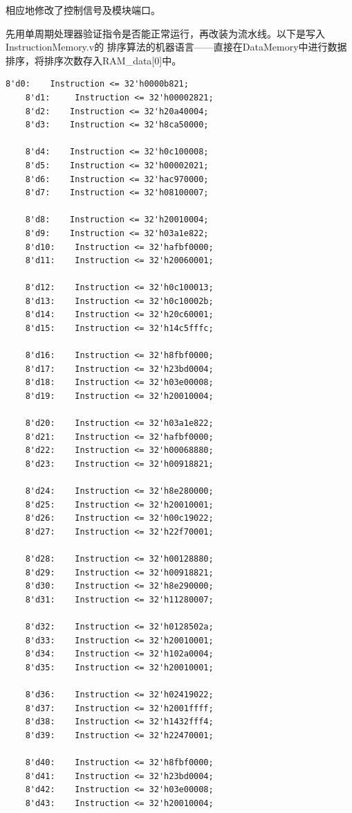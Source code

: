 \documentclass[10pt]{article}
\begin{document}
相应地修改了控制信号及模块端口。

先用单周期处理器验证指令是否能正常运行，再改装为流水线。以下是写入InstructionMemory.v的
排序算法的机器语言——直接在DataMemory中进行数据排序，将排序次数存入RAM\_data[0]中。
\begin{lstlisting}[style={verilog-style}]
    8'd0:    Instruction <= 32'h0000b821;
    8'd1:     Instruction <= 32'h00002821;
    8'd2:    Instruction <= 32'h20a40004;
    8'd3:    Instruction <= 32'h8ca50000;
    
    8'd4:    Instruction <= 32'h0c100008;
    8'd5:    Instruction <= 32'h00002021;
    8'd6:    Instruction <= 32'hac970000;
    8'd7:    Instruction <= 32'h08100007;
    
    8'd8:    Instruction <= 32'h20010004;
    8'd9:    Instruction <= 32'h03a1e822;
    8'd10:    Instruction <= 32'hafbf0000;
    8'd11:    Instruction <= 32'h20060001;
    
    8'd12:    Instruction <= 32'h0c100013;
    8'd13:    Instruction <= 32'h0c10002b;
    8'd14:    Instruction <= 32'h20c60001;
    8'd15:    Instruction <= 32'h14c5fffc;
    
    8'd16:    Instruction <= 32'h8fbf0000;
    8'd17:    Instruction <= 32'h23bd0004;
    8'd18:    Instruction <= 32'h03e00008;
    8'd19:    Instruction <= 32'h20010004;
    
    8'd20:    Instruction <= 32'h03a1e822;
    8'd21:    Instruction <= 32'hafbf0000;
    8'd22:    Instruction <= 32'h00068880;
    8'd23:    Instruction <= 32'h00918821;
    
    8'd24:    Instruction <= 32'h8e280000;
    8'd25:    Instruction <= 32'h20010001;
    8'd26:    Instruction <= 32'h00c19022;
    8'd27:    Instruction <= 32'h22f70001;
    
    8'd28:    Instruction <= 32'h00128880;
    8'd29:    Instruction <= 32'h00918821;
    8'd30:    Instruction <= 32'h8e290000;
    8'd31:    Instruction <= 32'h11280007;
    
    8'd32:    Instruction <= 32'h0128502a;
    8'd33:    Instruction <= 32'h20010001;
    8'd34:    Instruction <= 32'h102a0004;
    8'd35:    Instruction <= 32'h20010001;
    
    8'd36:    Instruction <= 32'h02419022;
    8'd37:    Instruction <= 32'h2001ffff;
    8'd38:    Instruction <= 32'h1432fff4;
    8'd39:    Instruction <= 32'h22470001;
    
    8'd40:    Instruction <= 32'h8fbf0000;
    8'd41:    Instruction <= 32'h23bd0004;
    8'd42:    Instruction <= 32'h03e00008;
    8'd43:    Instruction <= 32'h20010004;
    

\end{lstlisting}
\end{document}
